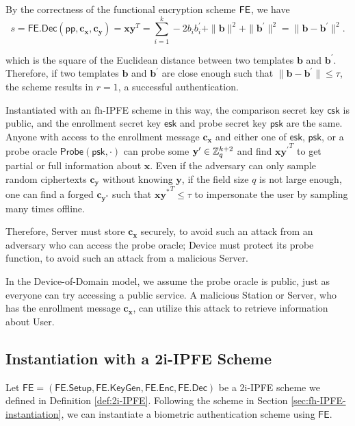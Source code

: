 By the correctness of the functional encryption scheme $\sf FE$, we have
\[
	s = \textsf{FE.Dec}(\textsf{pp}, \mathbf{c_x}, \mathbf{c_y}) =  \mathbf{x} \mathbf{y}^T = \sum_{i=1}^k -2b_ib_i^\prime + \|\mathbf{b}\|^2 + \|\mathbf{b}^\prime\|^2 = \| \mathbf{b} - \mathbf{b}^\prime \|^2.
\]

which is the square of the Euclidean distance between two templates $\mathbf{b}$ and $\mathbf{b}^\prime$. Therefore, if two templates $\mathbf{b}$ and $\mathbf{b}^\prime$ are close enough such that $\|\mathbf{b} - \mathbf{b}^\prime\| \leq \tau$, the scheme results in $r = 1$, a successful authentication.


Instantiated with an fh-IPFE scheme in this way, the comparison secret key $\textsf{csk}$ is public, and the enrollment secret key $\textsf{esk}$ and probe secret key $\textsf{psk}$ are the same. Anyone with access to the enrollment message $\mathbf{c_x}$ and either one of $\textsf{esk}$, $\textsf{psk}$, or a probe oracle $\textsf{Probe}(\textsf{psk}, \cdot )$ can probe some $\mathbf{y}^{\prime} \in \mathbb{Z}_q^{k+2}$ and find $\mathbf{x} {\mathbf{y}^\prime}^T$ to get partial or full information about $\mathbf{x}$. Even if the adversary can only sample random ciphertexts $\mathbf{c_{y}}$ without knowing $\mathbf{y}$, if the field size $q$ is not large enough, one can find a forged $\mathbf{c_{y^*}}$ such that $\mathbf{x}\mathbf{y^*}^T \leq \tau$ to impersonate the user by sampling many times offline.


Therefore, \textsf{Server} must store $\mathbf{c_x}$ securely, to avoid such an attack from an adversary who can access the probe oracle; \textsf{Device} must protect its probe function, to avoid such an attack from a malicious \textsf{Server}. 

In the Device-of-Domain model, we assume the probe oracle is public, just as everyone can try accessing a public service. A malicious \textsf{Station} or \textsf{Server}, who has the enrollment message $\mathbf{c_x}$, can utilize this attack to retrieve information about \textsf{User}.




\subsection{Instantiation with a 2i-IPFE Scheme}
\label{sec:2i-IPFE-instantiation}

Let $\textsf{FE} = (\textsf{FE.Setup}, \textsf{FE.KeyGen}, \textsf{FE.Enc}, \textsf{FE.Dec})$ be a 2i-IPFE scheme we defined in Definition \ref{def:2i-IPFE}. Following the scheme in Section \ref{sec:fh-IPFE-instantiation}, we can instantiate a biometric authentication scheme using $\textsf{FE}$.

